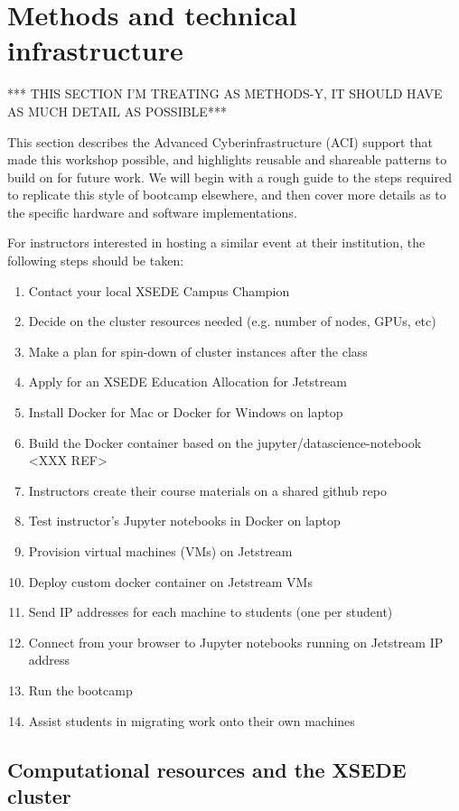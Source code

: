 \section{Methods and technical infrastructure}\label{sec:methods}

*** THIS SECTION I'M TREATING AS METHODS-Y, IT SHOULD HAVE AS MUCH DETAIL AS POSSIBLE***

This section describes the Advanced Cyberinfrastructure (ACI) support that made
this workshop possible, and highlights reusable and shareable patterns to build
on for future work. We will begin with a rough guide to the steps required to
replicate this style of bootcamp elsewhere, and then cover more details as to the
specific hardware and software implementations.

For instructors interested in hosting a similar event at their institution, the
following steps should be taken:

\begin{enumerate}
\item Contact your local XSEDE Campus Champion
\item Decide on the cluster resources needed (e.g. number of nodes, GPUs, etc)
\item Make a plan for spin-down of cluster instances after the class
\item Apply for an XSEDE Education Allocation for Jetstream
\item Install Docker for Mac or Docker for Windows on laptop
\item Build the Docker container based on the jupyter/datascience-notebook <XXX REF>
\item Instructors create their course materials on a shared github repo
\item Test instructor's Jupyter notebooks in Docker on laptop
\item Provision virtual machines (VMs) on Jetstream
\item Deploy custom docker container on Jetstream VMs
\item Send IP addresses for each machine to students (one per student)
\item Connect from your browser to Jupyter notebooks running on Jetstream IP address
\item Run the bootcamp
\item Assist students in migrating work onto their own machines
\end{enumerate}

\subsection{Computational resources and the XSEDE cluster}

